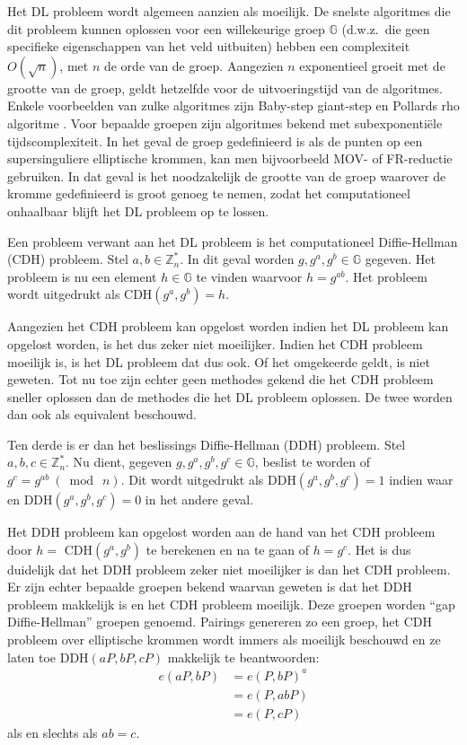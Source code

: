 Het DL probleem wordt algemeen aanzien als moeilijk. De snelste algoritmes die dit probleem kunnen oplossen voor een willekeurige groep $\mathbb{G}$ (d.w.z.\ die geen specifieke eigenschappen van het veld uitbuiten) hebben een complexiteit $O(\sqrt{n})$, met $n$ de orde van de groep. Aangezien $n$ exponentieel groeit met de grootte van de groep, geldt hetzelfde voor de uitvoeringstijd van de algoritmes. Enkele voorbeelden van zulke algoritmes zijn Baby-step giant-step \cite{baby-step} en Pollards rho algoritme \cite{pollard-rho}. Voor bepaalde groepen zijn algoritmes bekend met subexponenti\"ele tijdscomplexiteit. In het geval de groep gedefinieerd is als de punten op een supersinguliere elliptische krommen, kan men bijvoorbeeld MOV- \cite{mov} of FR-reductie \cite{ruck} gebruiken. In dat geval is het noodzakelijk de grootte van de groep waarover de kromme gedefinieerd is groot genoeg te nemen, zodat het computationeel onhaalbaar blijft het DL probleem op te lossen.

Een probleem verwant aan het DL probleem is het computationeel Diffie-Hellman (CDH) probleem. Stel $a, b \in \mathbb{Z}^*_n$. In dit geval worden $g, g^a, g^b \in \mathbb{G}$ gegeven. Het probleem is nu een element $h \in \mathbb{G}$ te vinden waarvoor $h = g^{ab}$. Het probleem wordt uitgedrukt als CDH$(g^a, g^b) = h$.

Aangezien het CDH probleem kan opgelost worden indien het DL probleem kan opgelost worden, is het dus zeker niet moeilijker. Indien het CDH probleem moeilijk is, is het DL probleem dat dus ook. Of het omgekeerde geldt, is niet geweten. Tot nu toe zijn echter geen methodes gekend die het CDH probleem sneller oplossen dan de methodes die het DL probleem oplossen. De twee worden dan ook als equivalent beschouwd.

Ten derde is er dan het beslissings Diffie-Hellman (DDH) probleem. Stel $a, b, c \in \mathbb{Z}^*_n$. Nu dient, gegeven $g, g^a, g^b, g^c \in \mathbb{G}$, beslist te worden of $g^c = g^{ab} \: (\bmod \: n)$. Dit wordt uitgedrukt als DDH$(g^a, g^b, g^c) = 1$ indien waar en DDH$(g^a, g^b, g^c) = 0$ in het andere geval.

Het DDH probleem kan opgelost worden aan de hand van het CDH probleem door $h =$ CDH$(g^a, g^b)$ te berekenen en na te gaan of $h = g^c$. Het is dus duidelijk dat het DDH probleem zeker niet moeilijker is dan het CDH probleem. Er zijn echter bepaalde groepen bekend waarvan geweten is dat het DDH probleem makkelijk is en het CDH probleem moeilijk. Deze groepen worden ``gap Diffie-Hellman'' groepen genoemd. Pairings genereren zo een groep, het CDH probleem over elliptische krommen wordt immers als moeilijk beschouwd en ze laten toe DDH$(aP, bP, cP)$ makkelijk te beantwoorden:
\[\begin{aligned}
e(aP, bP) &= e(P, bP)^a\\
								&= e(P, abP)\\
								&= e(P, cP)
\end{aligned}\]
als en slechts als $ab = c$.

